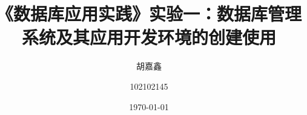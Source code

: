

\title{《数据库应用实践》实验一：数据库管理系统及其应用开发环境的创建使用}
\author{胡嘉鑫 \and 102102145}
\date{\today}





\maketitle

\tableofcontents




